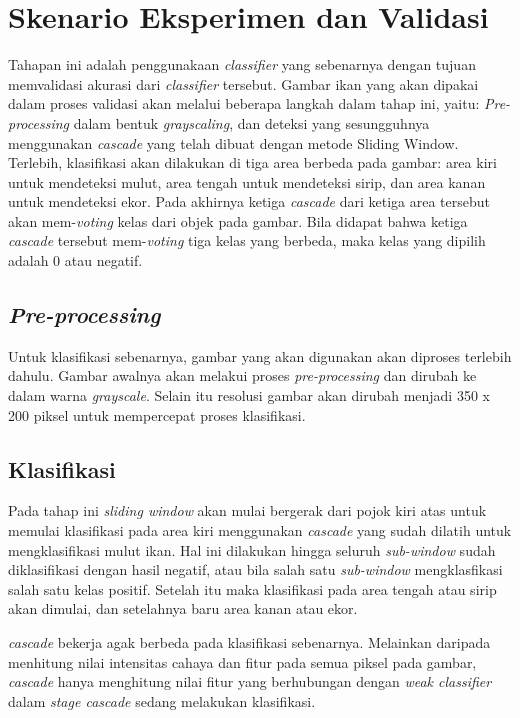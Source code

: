 \section{Skenario Eksperimen dan Validasi}

Tahapan ini adalah penggunakaan \emph{classifier} yang sebenarnya dengan tujuan 
memvalidasi akurasi dari \emph{classifier} tersebut. 
Gambar ikan yang akan dipakai dalam proses validasi akan 
melalui beberapa langkah dalam tahap ini, 
yaitu: \textit{Pre-processing} dalam bentuk \emph{grayscaling}, 
dan deteksi yang sesungguhnya menggunakan \emph{cascade} 
yang telah dibuat dengan metode Sliding Window. Terlebih, klasifikasi akan dilakukan di 
tiga area berbeda pada gambar: area kiri untuk mendeteksi mulut, area tengah untuk mendeteksi sirip, 
dan area kanan untuk mendeteksi ekor. Pada akhirnya ketiga \textit{cascade} 
dari ketiga area tersebut akan mem-\textit{voting} kelas dari objek pada gambar. 
Bila didapat bahwa ketiga \textit{cascade} tersebut mem-\textit{voting} tiga 
kelas yang berbeda, maka kelas yang dipilih adalah 0 atau negatif. 

\subsection{\textit{Pre-processing}}

Untuk klasifikasi sebenarnya, gambar yang akan digunakan 
akan diproses terlebih dahulu. 
Gambar awalnya akan melakui proses \textit{pre-processing} dan dirubah ke dalam warna 
\emph{grayscale}. %
Selain itu resolusi gambar akan dirubah menjadi 350 x 200 piksel untuk mempercepat 
proses klasifikasi.

\subsection{Klasifikasi} 

Pada tahap ini \textit{sliding window} akan mulai bergerak dari pojok kiri atas 
untuk memulai klasifikasi pada area kiri menggunakan \textit{cascade} 
yang sudah dilatih untuk mengklasifikasi mulut ikan. Hal ini dilakukan hingga 
seluruh \textit{sub-window} sudah diklasifikasi dengan hasil negatif, 
atau bila salah satu \textit{sub-window} mengklasfikasi salah satu kelas 
positif. Setelah itu maka klasifikasi pada area tengah atau sirip akan dimulai, dan 
setelahnya baru area kanan atau ekor.

\textit{cascade} bekerja agak berbeda pada klasifikasi sebenarnya. 
Melainkan daripada menhitung nilai intensitas cahaya dan fitur pada semua piksel 
pada gambar, \textit{cascade} hanya menghitung nilai fitur yang berhubungan 
dengan \textit{weak classifier} dalam \textit{stage cascade} sedang 
melakukan klasifikasi.

